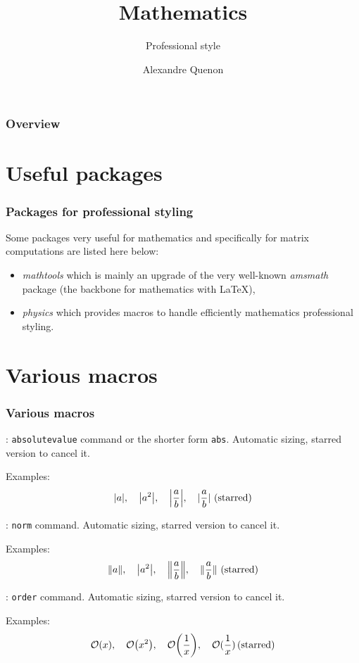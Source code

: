 \documentclass[11pt]{beamer}
\title{Mathematics}
\subtitle{Professional style}
\author[A. Quenon]{Alexandre Quenon}
\begin{document}
\begin{frame}
	\titlepage
\end{frame}


\begin{frame}
	\frametitle{Overview}
	
	\tableofcontents
\end{frame}


\section{Useful packages}

\begin{frame}
	\frametitle{Packages for professional styling}

	Some packages very useful for mathematics and specifically for matrix computations are listed here below:
	\begin{itemize}
		\item \emph{mathtools} which is mainly an upgrade of the very well-known \emph{amsmath} package (the backbone for mathematics with \LaTeX{}),
		\item \emph{physics} which provides macros to handle efficiently mathematics professional styling.
	\end{itemize}
\end{frame}


\section{Various macros}

\begin{frame}
	\frametitle{Various macros}
	
	: \texttt{absolutevalue} command or the shorter form \texttt{abs}.
	Automatic sizing, starred version to cancel it.
	
	Examples:
	\begin{equation*}
		\abs{a}, \quad
		\abs{a^2}, \quad
		\abs{\frac{a}{b}}, \quad
		\abs*{\frac{a}{b}} \, \text{(starred)}
	\end{equation*}
	
	
	: \texttt{norm} command.
	Automatic sizing, starred version to cancel it.
	
	Examples:
	\begin{equation*}
		\norm{a}, \quad
		\abs{a^2}, \quad
		\norm{\frac{a}{b}}, \quad
		\norm*{\frac{a}{b}} \, \text{(starred)}
	\end{equation*}
	
	
	: \texttt{order} command.
	Automatic sizing, starred version to cancel it.
	
	Examples:
	\begin{equation*}
		\order{x}, \quad
		\order{x^2}, \quad
		\order{\frac{1}{x}}, \quad
		\order*{\frac{1}{x}} \, \text{(starred)}
	\end{equation*}
\end{frame}
\end{document}
